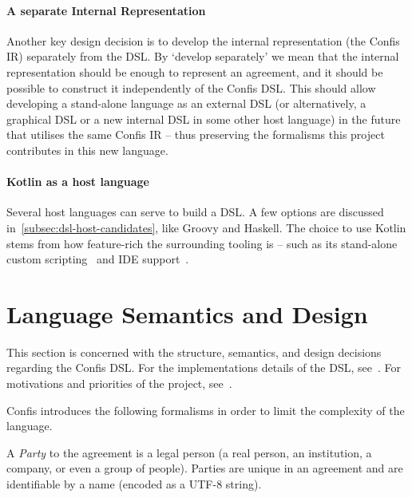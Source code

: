 \paragraph{A separate Internal Representation}
Another key design decision is to develop the internal representation (the Confis IR) separately from the DSL\@.
By `develop separately' we mean that the internal representation should be enough to represent an agreement, and it should be possible to construct it independently of the Confis DSL\@.
This should allow developing a stand-alone language as an external DSL (or alternatively, a graphical DSL or a new internal DSL in some other host language) in the future that utilises the same Confis IR -- thus preserving the formalisms this project contributes in this new language.

\paragraph{Kotlin as a host language} Several host languages can serve to build a DSL.
A few options are discussed in~\autoref{subsec:dsl-host-candidates}, like Groovy and Haskell.
The choice to use Kotlin stems from how feature-rich the surrounding tooling is -- such as its stand-alone custom scripting~\cite{kotlinScriptKeep} and IDE support~\cite{intelliJRepo}.


\section{Language Semantics and Design}\label{sec:language-semantics}

This section is concerned with the structure, semantics, and design decisions regarding the Confis DSL.
For the implementations details of the DSL, see~.
For motivations and priorities of the project, see~.


Confis introduces the following formalisms in order to limit the complexity of the language.

\begin{definition}[Party]
    \label{def:party}

    A \emph{Party} to the agreement is a legal person (a real person, an institution, a company, or even a group of people).
    Parties are unique in an agreement and are identifiable by a name (encoded as a UTF-8 string).
\end{definition}

